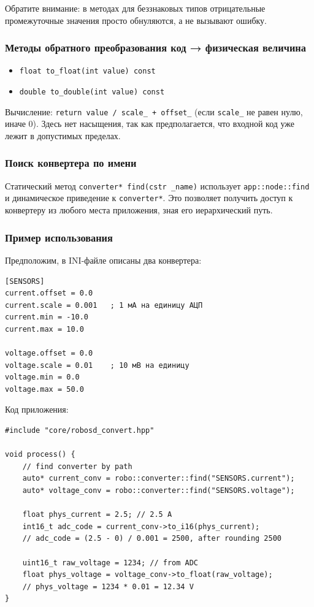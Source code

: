 \documentclass[a4paper,12pt]{article}
\begin{document}
Обратите внимание: в методах для беззнаковых типов отрицательные промежуточные значения просто обнуляются, а не вызывают ошибку.

\subsubsection{Методы обратного преобразования код → физическая величина}

\begin{itemize}
    \item \texttt{float to\_float(int value) const}
    \item \texttt{double to\_double(int value) const}
\end{itemize}

Вычисление: \texttt{return value / scale\_ + offset\_} (если \texttt{scale\_} не равен нулю, иначе 0). Здесь нет насыщения, так как предполагается, что входной код уже лежит в допустимых пределах.

\subsubsection{Поиск конвертера по имени}

Статический метод \texttt{converter* find(cstr \_name)} использует \texttt{app::node::find} и динамическое приведение к \texttt{converter*}. Это позволяет получить доступ к конвертеру из любого места приложения, зная его иерархический путь.

\subsubsection{Пример использования}

Предположим, в INI-файле описаны два конвертера:

\begin{verbatim}
[SENSORS]
current.offset = 0.0
current.scale = 0.001   ; 1 мА на единицу АЦП
current.min = -10.0
current.max = 10.0

voltage.offset = 0.0
voltage.scale = 0.01    ; 10 мВ на единицу
voltage.min = 0.0
voltage.max = 50.0
\end{verbatim}

Код приложения:

\begin{lstlisting}[caption={Использование конвертера}]
#include "core/robosd_convert.hpp"

void process() {
    // find converter by path
    auto* current_conv = robo::converter::find("SENSORS.current");
    auto* voltage_conv = robo::converter::find("SENSORS.voltage");

    float phys_current = 2.5; // 2.5 A
    int16_t adc_code = current_conv->to_i16(phys_current);
    // adc_code = (2.5 - 0) / 0.001 = 2500, after rounding 2500

    uint16_t raw_voltage = 1234; // from ADC
    float phys_voltage = voltage_conv->to_float(raw_voltage);
    // phys_voltage = 1234 * 0.01 = 12.34 V
}
\end{lstlisting}
\end{document}
